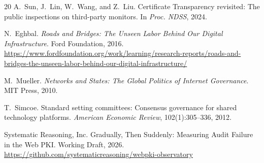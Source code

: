 \documentclass[10pt,twocolumn,letterpaper]{article}
\begin{document}
\begin{thebibliography}{20}
A.~Sun, J.~Lin, W.~Wang, and Z.~Liu.
Certificate Transparency revisited: The public inspections on third-party monitors.
In \textit{Proc. NDSS}, 2024.

N.~Eghbal.
\textit{Roads and Bridges: The Unseen Labor Behind Our Digital Infrastructure}.
Ford Foundation, 2016.
\url{https://www.fordfoundation.org/work/learning/research-reports/roads-and-bridges-the-unseen-labor-behind-our-digital-infrastructure/}


M.~Mueller.
\textit{Networks and States: The Global Politics of Internet Governance}.
MIT Press, 2010.

T.~Simcoe.
Standard setting committees: Consensus governance for shared technology platforms.
\textit{American Economic Review}, 102(1):305--336, 2012.

Systematic Reasoning, Inc.
Gradually, Then Suddenly: Measuring Audit Failure in the Web PKI.
Working Draft, 2026.
\url{https://github.com/systematicreasoning/webpki-observatory}

\end{thebibliography}
\end{document}
